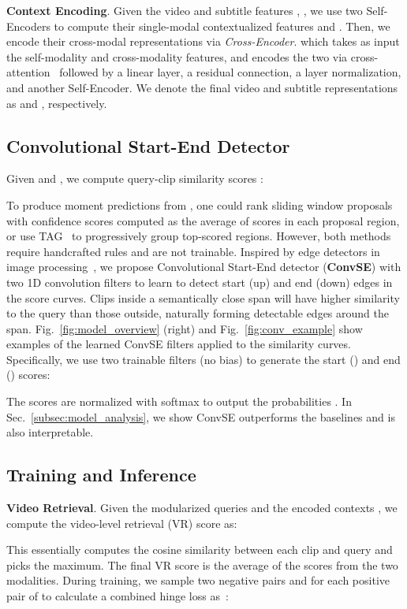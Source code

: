 \documentclass[runningheads]{llncs}
\begin{document}
\kern1mm
\noindent\textbf{Context Encoding}.
Given the video and subtitle features , , we use two Self-Encoders to compute their single-modal contextualized features  and . 
Then, we encode their cross-modal representations via \textit{Cross-Encoder}.
which takes as input the self-modality and cross-modality features, and encodes the two via  cross-attention~\cite{vaswani2017attention} followed by a linear layer, a residual connection, a layer normalization, and another Self-Encoder.
We denote the final video and subtitle representations as  and , respectively.


\subsection{Convolutional Start-End Detector}\label{subsec:convse}
Given  and , we compute query-clip similarity scores :


To produce moment predictions from , one could rank sliding window proposals with confidence scores computed as the average of scores in each proposal region, or use TAG~\cite{zhao2017temporal} to progressively group top-scored regions. However, both methods require handcrafted rules and are not trainable. Inspired by edge detectors in image processing~\cite{szeliski2010computer}, we propose Convolutional Start-End detector (\textbf{ConvSE}) with two 1D convolution filters to learn to detect start (up) and end (down) edges in the score curves. Clips inside a semantically close span will have higher similarity to the query than those outside, naturally forming detectable edges around the span. Fig.~\ref{fig:model_overview} (right) and Fig.~\ref{fig:conv_example} show examples of the learned ConvSE filters applied to the similarity curves. Specifically, we use two trainable filters (no bias) to generate the start () and end () scores:

The scores are normalized with softmax to output the probabilities . 
In Sec.~\ref{subsec:model_analysis}, we show ConvSE outperforms the baselines and is also interpretable.


\subsection{Training and Inference}\label{subsec:training_inference}
\noindent\textbf{Video Retrieval}.
Given the modularized queries  and the encoded contexts , we compute the video-level retrieval (VR) score as:

This essentially computes the cosine similarity between each clip and query and picks the maximum.
The final VR score is the average of the scores from the two modalities.
During training, we sample two negative pairs  and  for each positive pair of  to calculate a combined hinge loss as~\cite{yu2018mattnet}:
\end{document}
